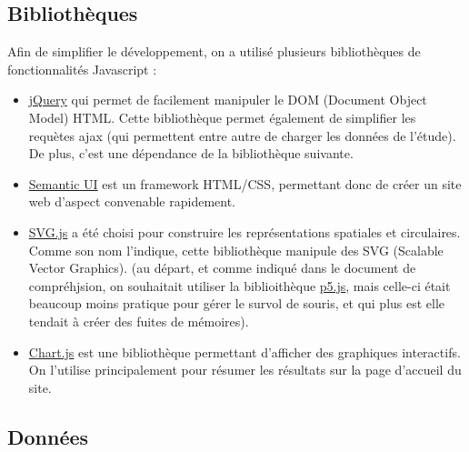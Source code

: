 \documentclass{article}
\begin{document}
\subsection{Bibliothèques}
Afin de simplifier le développement, on a utilisé plusieurs bibliothèques de fonctionnalités Javascript :
\begin{itemize}
    \item \href{https://jquery.com/}{jQuery} qui permet de facilement manipuler le DOM (Document Object Model) HTML. Cette bibliothèque permet également de simplifier les requètes ajax (qui permettent entre autre de charger les données de l'étude). De plus, c'est une dépendance de la bibliothèque suivante.
    \item \href{https://semantic-ui.com/}{Semantic UI} est un framework HTML/CSS, permettant donc de créer un site web d'aspect convenable rapidement.
    \item \href{http://svgjs.com/}{SVG.js} a été choisi pour construire les représentations spatiales et circulaires. Comme son nom l'indique, cette bibliothèque manipule des SVG (Scalable Vector Graphics). (au départ, et comme indiqué dans le document de compréhjsion, on souhaitait utiliser la biblioithèque \href{https://p5js.org/}{p5.js}, mais celle-ci était beaucoup moins pratique pour gérer le survol de souris, et qui plus est elle tendait à créer des fuites de mémoires).
    \item \href{http://www.chartjs.org/}{Chart.js} est une bibliothèque permettant d'afficher des graphiques interactifs. On l'utilise principalement pour résumer les résultats sur la page d'accueil du site.
\end{itemize}

\subsection{Données}
\end{document}
